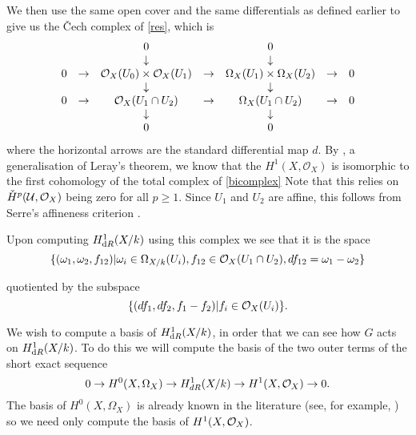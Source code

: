 \documentclass[draft, 11pt]{article} %
\theoremstyle{plain}
\theoremstyle{remark}
\newcommand{\cO}{{\cal O}}
\newcommand{\ra}{\rightarrow}
\newcommand{\cech}{\v{C}ech }
\newcommand{\hone}{H^1(X,\mathcal{O}_X)}
\begin{document}
{We then use the same open cover and the same differentials as defined earlier to give us the \cech complex of \eqref{res}, which is
\begin{equation}\label{bicomplex} \begin{array}{ccccccc}
~ & ~ & 0 & ~ & 0 & ~ & ~ \\
~ & ~ & \downarrow & ~ & \downarrow & ~ & ~ \\
0 & \rightarrow & \cO_X(U_0)\times \cO_X(U_1) & \rightarrow & \Omega_X(U_1)\times \Omega_X(U_2) & \rightarrow & 0 \\
~ & ~ & \downarrow & ~ & \downarrow & ~ & ~ \\
0 & \rightarrow & \cO_X(U_1 \cap U_2) & \rightarrow & \Omega_X(U_1 \cap U_2) & \rightarrow & 0 \\
~ & ~ & \downarrow & ~ & \downarrow & ~ & ~ \\
~ & ~ & 0 & ~ & 0 & ~ & ~ \\
\end{array}
\end{equation}
where the horizontal arrows are the standard differential map $d$.
By \cite[Cor. 12.4.7]{EGA0III}, a generalisation of Leray's theorem, we know that the $\hone$ is isomorphic to the first cohomology of the total complex of \eqref{bicomplex}
Note that this relies on ${\check H}^p({\mathcal U},\cO_X) $ being zero for all $p\geq 1$.
Since $U_1$ and $U_2$ are affine, this follows from Serre's affineness criterion \cite[Thm 5.2.23]{liu}.



Upon computing $H^1_{{\text dR}}(X/k)$ using this complex we see that it is the space
\begin{equation}\label{derhamconditions}
\{(\omega_1, \omega_2, f_{12}) | \omega_i\in \Omega_{X/k}(U_i), f_{12}\in \cO_X(U_1 \cap U_2), df_{12} = \omega_1 - \omega_2\}
\end{equation}

quotiented by the subspace
\[
\{ (df_1, df_2, f_1-f_2)|f_i \in \cO_X(U_i)\}.
\]

We wish to compute a basis of $H^1_{{\text dR}}(X/k)$, in order that we can see how $G$ acts on $H^1_{{\text dR}}(X/k)$.
To do this we will compute the basis of the two outer terms of the short exact sequence
\begin{equation}\label{ses}
0 \ra H^0(X,\Omega_X) \ra H^1_{dR}(X/k) \ra H^1(X,\cO_X) \ra 0.
\end{equation}
The basis of $H^0(X,\Omega_X)$ is already known in the literature (see, for example, \cite[Prop. 7.4.26]{liu}) so we need only compute the basis of $H^1(X,\cO_X)$.

}
\end{document}
